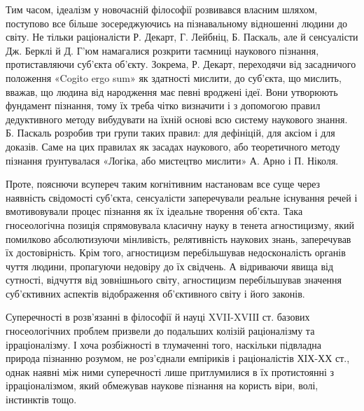 Тим часом, ідеалізм у новочасній філософії розвивався власним шляхом,
поступово все більше зосереджуючись на пізнавальному відношенні людини до
світу. Не тільки раціоналісти Р. Декарт, Г. Лейбніц, Б. Паскаль, але й
сенсуалісти Дж. Берклі й Д. Г’юм намагалися розкрити таємниці наукового
пізнання, протиставляючи суб’єкта об’єкту. Зокрема, Р. Декарт, переходячи від
засадничого положення «Cogito ergo sum» як здатності мислити, до суб’єкта,
що мислить, вважав, що людина від народження має певні вроджені ідеї. Вони
утворюють фундамент пізнання, тому їх треба чітко визначити і з допомогою
правил дедуктивного методу вибудувати на їхній основі всю систему наукового
знання. Б. Паскаль розробив три групи таких правил: для дефініцій, для аксіом і
для доказів. Саме на цих правилах як засадах наукового, або теоретичного
методу пізнання ґрунтувалася «Логіка, або мистецтво мислити» А. Арно і П.
Ніколя.

Проте, пояснючи всупереч таким когнітивним настановам все суще через
наявність свідомості суб’єкта, сенсуалісти заперечували реальне існування
речей і вмотивовували процес пізнання як їх ідеальне творення об’єкта. Така
гносеологічна позиція спрямовувала класичну науку в тенета агностицизму,
який помилково абсолютизуючи мінливість, релятивність наукових знань,
заперечував їх достовірність. Крім того, агностицизм перебільшував
недосконалість органів чуття людини, пропагуючи недовіру до їх свідчень. А
відриваючи явища від сутності, відчуття від зовнішнього світу, агностицизм
перебільшував значення суб’єктивних аспектів відображення об’єктивного
світу і його законів.

Суперечності в розв’язанні в філософії й науці XVII-XVIIІ ст. базових
гносеологічних проблем призвели до подальших колізій раціоналізму та
ірраціоналізму. І хоча розбіжності в тлумаченні того, наскільки підвладна
природа пізнанню розумом, не роз’єднали емпіриків і раціоналістів ХІХ-ХХ ст.,
однак наявні між ними суперечності лише притлумилися в їх протистоянні з
ірраціоналізмом, який обмежував наукове пізнання на користь віри, волі,
інстинктів тощо.

